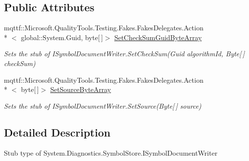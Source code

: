 \subsection*{Public Attributes}
\begin{DoxyCompactItemize}
\item 
mqttf\-::\-Microsoft.\-Quality\-Tools.\-Testing.\-Fakes.\-Fakes\-Delegates.\-Action\\*
$<$ global\-::\-System.\-Guid, byte\mbox{[}$\,$\mbox{]}$>$ \hyperlink{class_system_1_1_diagnostics_1_1_symbol_store_1_1_fakes_1_1_stub_i_symbol_document_writer_a914848ababf7511654f44c195491b3e3}{Set\-Check\-Sum\-Guid\-Byte\-Array}
\begin{DoxyCompactList}\small\item\em Sets the stub of I\-Symbol\-Document\-Writer.\-Set\-Check\-Sum(\-Guid algorithm\-Id, Byte\mbox{[}$\,$\mbox{]} check\-Sum)\end{DoxyCompactList}\item 
mqttf\-::\-Microsoft.\-Quality\-Tools.\-Testing.\-Fakes.\-Fakes\-Delegates.\-Action\\*
$<$ byte\mbox{[}$\,$\mbox{]}$>$ \hyperlink{class_system_1_1_diagnostics_1_1_symbol_store_1_1_fakes_1_1_stub_i_symbol_document_writer_a8ea940457edf3f9edfcb005d76548b19}{Set\-Source\-Byte\-Array}
\begin{DoxyCompactList}\small\item\em Sets the stub of I\-Symbol\-Document\-Writer.\-Set\-Source(\-Byte\mbox{[}$\,$\mbox{]} source)\end{DoxyCompactList}\end{DoxyCompactItemize}


\subsection{Detailed Description}
Stub type of System.\-Diagnostics.\-Symbol\-Store.\-I\-Symbol\-Document\-Writer



